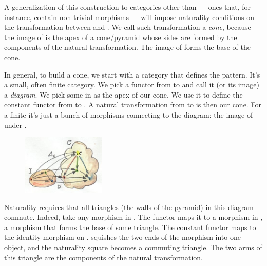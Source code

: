 \noindent
A generalization of this construction to categories other than
 --- ones that, for instance, contain non-trivial morphisms
--- will impose naturality conditions on the transformation between
 and . We call such transformation a \emph{cone},
because the image of \mathtext{\Delta} is the apex of a cone/pyramid whose sides are
formed by the components of the natural transformation. The image of 
forms the base of the cone.

In general, to build a cone, we start with a category  that
defines the pattern. It's a small, often finite category. We pick a
functor  from  to  and call it (or its image) a
\emph{diagram}. We pick some  in  as the apex of our
cone. We use it to define the constant functor  from
 to . A natural transformation from 
to  is then our cone. For a finite  it's just a bunch of
morphisms connecting  to the diagram: the image of 
under .

\begin{figure}[H]
\centering
\includegraphics[width=1.56250in]{images/cone.jpg}
\end{figure}

\noindent
Naturality requires that all triangles (the walls of the pyramid) in
this diagram commute. Indeed, take any morphism  in .
The functor  maps it to a morphism  in , a
morphism that forms the base of some triangle. The constant functor
 maps  to the identity morphism on
. \mathtext{\Delta} squishes the two ends of the morphism into one object, and
the naturality square becomes a commuting triangle. The two arms of this
triangle are the components of the natural transformation.

\begin{figure}[H]
\centering
{}
\end{figure}

